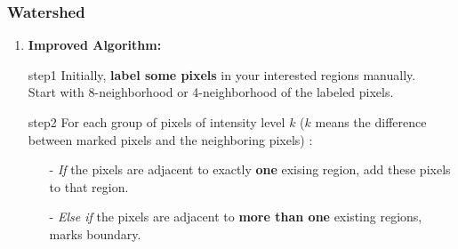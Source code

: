 \documentclass[notheorems,mathserif,table,compress]{beamer}  %
\begin{document}
\begin{frame}
    \frametitle{Watershed}
    \begin{enumerate}[{\color{black}{\Large (C)}}]
    \item  \textbf{\Large Improved Algorithm:}
    \end{enumerate}
        \begin{itemize}
        \item[step1] Initially, {\textbf{label some pixels}} in your interested regions manually. \\
	Start with 8-neighborhood or 4-neighborhood of the labeled pixels. 
        \item[step2] For each group of pixels of intensity level $k$ ($k$ means the difference between marked pixels and the neighboring pixels) :
	     \begin{itemize}
             \item[-] \emph{If} the pixels are adjacent to exactly {\textbf{one}} exising region, add these pixels to that region. 
             \item[-] \emph{Else if} the pixels are adjacent to {\textbf{more than one}} existing regions, marks boundary. 
             \end{itemize}
        \end{itemize}
\end{frame}
\end{document}
